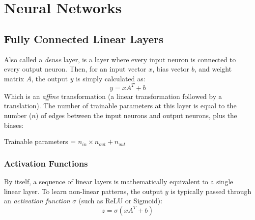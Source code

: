 \section{Neural Networks}

\bigskip

\subsection{Fully Connected Linear Layers}

\medskip

Also called a \textit{dense} layer, is a layer where every input neuron is connected to every output neuron. Then, for an input vector $x$, bias vector $b$, and weight matrix $A$, the output $y$ is simply calculated as:
\[
y = xA^T + b
\]
Which is an \textit{affine} transformation (a linear transformation followed by a translation). The number of trainable parameters at this layer is equal to the number ($n$) of edges between the input neurons and output neurons, plus the biases:
\begin{center}
    Trainable parameters = $n_{in} \times n_{out} + n_{out}$
\end{center}

\subsubsection{Activation Functions}

By itself, a sequence of linear layers is mathematically equivalent to a single linear layer. To learn non-linear patterns, the output $y$ is typically passed through an \textit{activation function} $\sigma$ (such as ReLU or Sigmoid):
\[
z = \sigma(xA^T + b)
\]

\medskip

